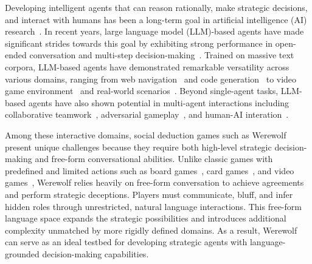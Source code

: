 Developing intelligent agents that can reason rationally, make strategic decisions, and interact with humans has been a long-term goal in artificial intelligence (AI) research~\cite{wooldridge1995intelligent,russell2016artificial}. In recent years, large language model (LLM)-based agents have made significant strides towards this goal by exhibiting strong performance in open-ended conversation and multi-step decision-making~\cite{brown2020language,ouyang2022training}. Trained on massive text corpora, LLM-based agents have demonstrated remarkable versatility across various domains, ranging from web navigation~\cite{nakano2021webgpt,yao2022react} and code generation~\cite{chen2021evaluating,yang2024swe} to video game environment~\cite{wang2023voyager} and real-world scenarios~\cite{ahn2022can,brohan2023rt}. Beyond single-agent tasks, LLM-based agents have also shown potential in multi-agent interactions including collaborative teamwork~\cite{li2023camel}, adversarial gameplay~\cite{meta2022human}, and human-AI interation~\cite{park2023generative,liu2023llm}.


Among these interactive domains, social deduction games such as Werewolf present unique challenges because they require both high-level strategic decision-making and free-form conversational abilities. Unlike classic games with predefined and limited actions such as board games~\cite{silver2016mastering,silver2018general}, card games~\cite{moravvcik2017deepstack,brown2018superhuman}, and video games~\cite{mnih2013playing,vinyals2019grandmaster}, Werewolf relies heavily on free-form conversation to achieve agreements and perform strategic deceptions. Players must communicate, bluff, and infer hidden roles through unrestricted, natural language interactions. This free-form language space expands the strategic possibilities and introduces additional complexity unmatched by more rigidly defined domains. As a result, Werewolf can serve as an ideal testbed for developing strategic agents with language-grounded decision-making capabilities.

